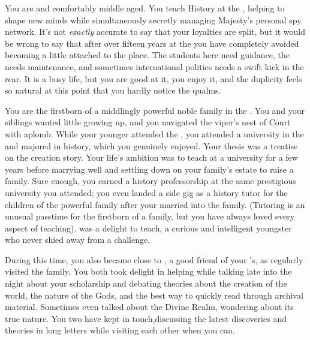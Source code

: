 \documentclass[char]{GL2020}
\begin{document}
\name{\cHistory{}}

You are \cHistory{\intro} and comfortably middle aged. You teach History at the \pSchool{}, helping to shape new minds while simultaneously secretly managing \cQueen{\Their} Majesty's personal spy network. It's not \emph{exactly} accurate to say that your loyalties are split, but it would be wrong to say that after over fifteen years at the \pSchool{} you have completely avoided becoming a little attached to the place. The students here need guidance, the \pSc{} needs maintenance, and sometimes international politics needs a swift kick in the rear. It is a busy life, but you are good at it, you enjoy it, and the duplicity feels so natural at this point that you hardly notice the qualms.

You are the firstborn \cHistory{\offspring} of a middlingly powerful noble family in the \pFarm{}. You and your siblings wanted little growing up, and you navigated the viper's nest of Court with aplomb. While your younger \cWildCardFriend{\sibling} \cWildCardFriend{} attended the \pSchool{}, you attended a university in the \pFarm{} and majored in history, which you genuinely enjoyed. Your thesis was a treatise on the creation story. Your life's ambition was to teach at a \pFarm{} university for a few years before marrying well and settling down on your family's estate to raise a family. Sure enough, you earned a history professorship at the same prestigious university you attended; you even landed a side gig as a history tutor for the children of the powerful \cChupStudent{\formal} family after your \cWildCardFriend{\sibling} married into the family. (Tutoring is an unusual passtime for the firstborn of a family, but you have always loved every aspect of teaching). \cChupStudent{\full} was a delight to teach, a curious and intelligent youngster who never shied away from a challenge.

During this time, you also became close to \cWildCard{\full}, a good friend of your \cWildCardFriend{\sibling}’s, as \cWildCard{\they} regularly visited the \cChupStudent{\formal} family. You both took delight in helping \cChupStudent{} while talking late into the night about your scholarship and debating theories about the creation of the world, the nature of the Gods, and the best way to quickly read through archival material. Sometimes \cWildCard{\they} even talked about the Divine Realm, wondering about its true nature. You two have kept in touch,discussing the latest discoveries and theories in long letters while visiting each other when you can. 
\end{document}
